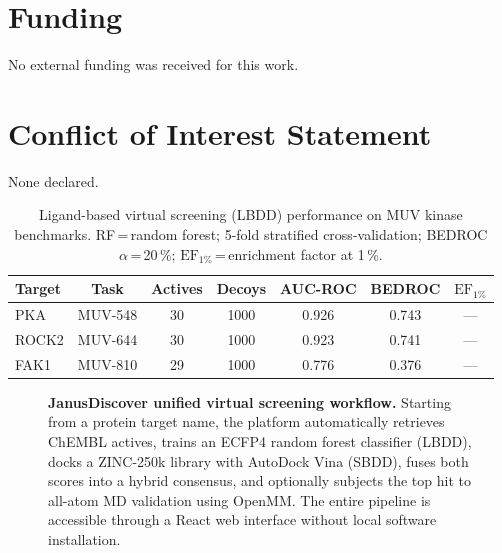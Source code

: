\documentclass[12pt,a4paper]{article}
\begin{document}
\section*{Funding}

No external funding was received for this work.

\section*{Conflict of Interest Statement}

None declared.



\newpage
\begin{table}[h!]
\centering
\caption{Ligand-based virtual screening (LBDD) performance on MUV kinase benchmarks.
  RF\,=\,random forest; 5-fold stratified cross-validation;
  BEDROC $\alpha$\,=\,20\,\%; $\text{EF}_{1\%}$\,=\,enrichment factor at 1\,\%.}
\label{tab:lbdd}
\begin{tabular}{lcccccc}
\toprule
Target & Task & Actives & Decoys & AUC-ROC & BEDROC & $\text{EF}_{1\%}$ \\
\midrule
PKA   & MUV-548 & 30 & 1000 & 0.926 & 0.743 & --- \\
ROCK2 & MUV-644 & 30 & 1000 & 0.923 & 0.741 & --- \\
FAK1  & MUV-810 & 29 & 1000 & 0.776 & 0.376 & --- \\
\bottomrule
\end{tabular}
\end{table}

\newpage
\begin{figure}[h!]
\centering
\caption{
  \textbf{JanusDiscover unified virtual screening workflow.}
  Starting from a protein target name, the platform automatically retrieves
  ChEMBL actives, trains an ECFP4 random forest classifier (LBDD),
  docks a ZINC-250k library with AutoDock Vina (SBDD), fuses both scores
  into a hybrid consensus, and optionally subjects the top hit to all-atom
  MD validation using OpenMM.  The entire pipeline is accessible through a
  React web interface without local software installation.
}
\label{fig:workflow}
\end{figure}
\end{document}
